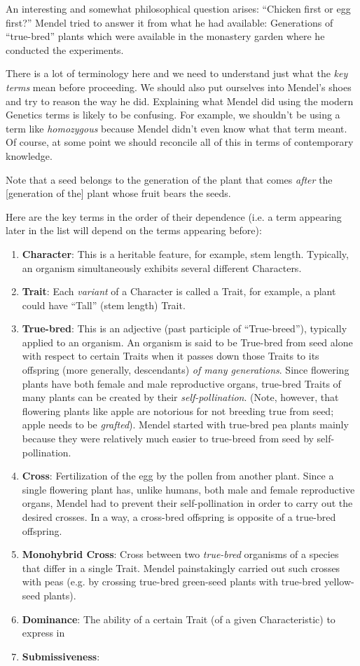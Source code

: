 An interesting and somewhat philosophical question arises: ``Chicken first or egg first?'' Mendel tried to answer it from what he had available: Generations of ``true-bred'' plants which were available in the monastery garden where he conducted the experiments. 

There is a lot of terminology here and we need to understand just what the \emph{key terms} mean before proceeding. We should also put ourselves into Mendel's shoes and try to reason the way he did. Explaining what Mendel did using the modern Genetics terms is likely to be confusing. For example, we shouldn't be using a term like \emph{homozygous} because Mendel didn't even know what that term meant. Of course, at some point we should reconcile all of this in terms of contemporary knowledge. 

Note that a seed belongs to the generation of the plant that comes \emph{after} the [generation of the] plant whose fruit bears the seeds.

Here are the key terms in the order of their dependence (i.e. a term appearing later in the list will depend on the terms appearing before):
\begin{enumerate}
    \item \textbf{Character}: This is a heritable feature, for example, stem length. Typically, an organism simultaneously exhibits several different Characters.
    \item \textbf{Trait}: Each \emph{variant} of a Character is called a Trait, for example, a plant could have ``Tall'' (stem length) Trait.
    \item \textbf{True-bred}: This is an adjective (past participle of ``True-breed''), typically applied to an organism. An organism is said to be True-bred from seed alone with respect to certain Traits when it passes down those Traits to its offspring (more generally, descendants) \emph{of many generations}. Since flowering plants have both female and male reproductive organs, true-bred Traits of many plants can be created by their \emph{self-pollination}. (Note, however, that flowering plants like apple are notorious for not breeding true from seed; apple needs to be \emph{grafted}). Mendel started with true-bred pea plants mainly because they were relatively much easier to true-breed from seed by self-pollination.
    \item \textbf{Cross}: Fertilization of the egg by the pollen from another plant. Since a single flowering plant has, unlike humans, both male and female reproductive organs, Mendel had to prevent their self-pollination in order to carry out the desired crosses. In a way, a cross-bred offspring is opposite of a true-bred offspring.
    \item \textbf{Monohybrid Cross}: Cross between two \emph{true-bred} organisms of a species that differ in a single Trait. Mendel painstakingly carried out such crosses with peas (e.g. by crossing true-bred green-seed plants with true-bred yellow-seed plants).
    \item \textbf{Dominance}: The ability of a certain Trait (of a given Characteristic) to express in 
    \item \textbf{Submissiveness}:
\end{enumerate}

